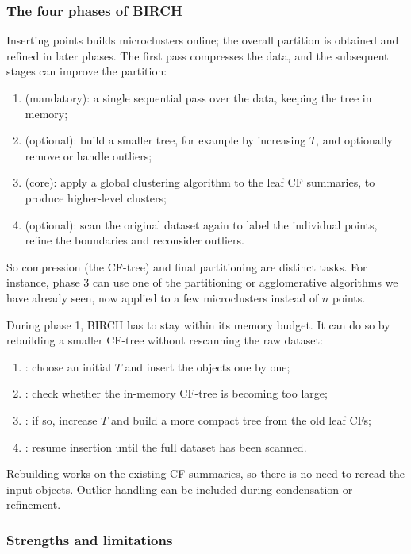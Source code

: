 \subsubsection{The four phases of BIRCH}

Inserting points builds microclusters online; the overall partition is obtained and refined in later phases. The first pass compresses the data, and the subsequent stages can improve the partition:
\begin{enumerate}
  \item {} (mandatory): a single sequential pass over the data, keeping the tree in memory;
  \item {} (optional): build a smaller tree, for example by increasing $T$, and optionally remove or handle outliers;
  \item {} (core): apply a global clustering algorithm to the leaf CF summaries, to produce higher-level clusters;
  \item {} (optional): scan the original dataset again to label the individual points, refine the boundaries and reconsider outliers.
\end{enumerate}
So compression (the CF-tree) and final partitioning are distinct tasks. For instance, phase 3 can use one of the partitioning or agglomerative algorithms we have already seen, now applied to a few microclusters instead of $n$ points.

During phase 1, BIRCH has to stay within its memory budget. It can do so by rebuilding a smaller CF-tree without rescanning the raw dataset:
\begin{enumerate}
  \item {}: choose an initial $T$ and insert the objects one by one;
  \item {}: check whether the in-memory CF-tree is becoming too large;
  \item {}: if so, increase $T$ and build a more compact tree from the old leaf CFs;
  \item {}: resume insertion until the full dataset has been scanned.
\end{enumerate}
Rebuilding works on the existing CF summaries, so there is no need to reread the input objects. Outlier handling can be included during condensation or refinement.

\subsubsection{Strengths and limitations}

